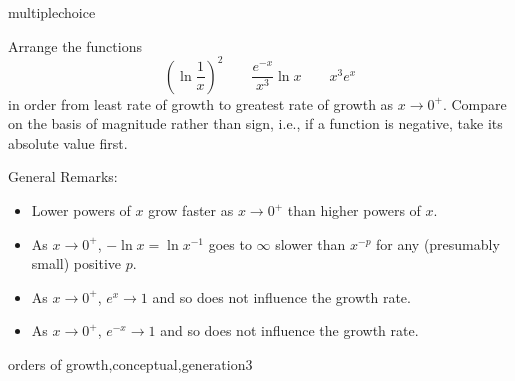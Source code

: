 \documentclass{ximera}
\begin{document}
\begin{question}[GrowthOrdZERO001]
\begin{type}
multiplechoice
\end{type}
Arrange the functions 
\[ \left( \ln \frac{1}{x} \right)^2 \qquad \frac{e^{- x}}{x^{3}} \ln{x} \qquad x^{3} e^{x} \]
in order from least rate of growth to greatest rate of growth as \(x \rightarrow 0^+\). Compare on the basis of magnitude rather than sign, i.e., if a function is negative, take its absolute value first.
\begin{multiplechoice}
 \choicebreak
{}
\end{multiplechoice}
\begin{feedback}
General Remarks:
\begin{itemize} \item Lower powers of \(x\) grow faster as \(x \rightarrow 0^+\) than higher powers of \(x\).
\item As \(x \rightarrow 0^+\), \(-\ln x = \ln x^{-1}\) goes to \(\infty\) slower than \(x^{-p}\) for any (presumably small) positive \(p\).
\item As \(x \rightarrow 0^+\), \(e^{x} \rightarrow 1\) and so does not influence the growth rate.
\item As \(x \rightarrow 0^+\), \(e^{-x} \rightarrow 1\) and so does not influence the growth rate.
\end{itemize}
\end{feedback}
\begin{keywords}
orders of growth,conceptual,generation3
\end{keywords}
\end{question}
\end{document}
